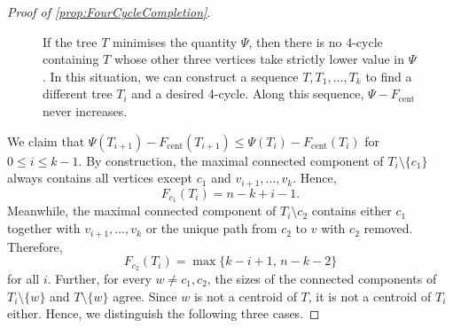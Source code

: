 \documentclass[10pt,a4paper]{amsart}
\newtheorem{scope}{Scope}
\begin{document}
\begin{proof} [Proof of \autoref{prop:FourCycleCompletion}]
\begin{figure}[tbp]
				\vspace{-3mm}
				\caption{If the tree $T$ minimises the quantity $\Psi$, then there is no 4-cycle containing $T$ whose other three vertices take strictly lower value in $\Psi$. In this situation, we can construct a sequence $T,T_1,\ldots, T_k$ to find a different tree $T_i$ and a desired 4-cycle. Along this sequence, $\Psi - F_\mathrm{cent}$ never increases.}
				\label{fig:FourCycleCompletion}
			\end{figure}
			
			We claim that $\Psi(T_{i+1}) - F_\mathrm{cent} (T_{i+1}) \leq \Psi(T_i) - F_\mathrm{cent} (T_i)$ for $0\leq i \leq k-1$. By construction, the maximal connected component of $T_i\setminus \{c_1\}$ always contains all vertices except $c_1$ and $v_{i+1},\ldots, v_k$. Hence,
			\[
				F_{c_1} (T_i) = n-k+i-1.
			\]
			Meanwhile, the maximal connected component of $T_i\setminus c_2$ contains either $c_1$ together with $v_{i+1},\ldots, v_k$ or the unique path from $c_2$ to $v$ with $c_2$ removed. Therefore, 
			\[
				F_{c_2} (T_i) = \max \{ k-i+1, \, n-k-2 \}
			\]
			for all $i$. Further, for every $w \neq c_1,c_2$, the sizes of the connected components of $T_i\setminus \{w\}$ and $T\setminus \{w\}$ agree. Since $w$ is not a centroid of $T$, it is not a centroid of $T_i$ either. Hence, we distinguish the following three cases.


\end{proof}
\end{document}
